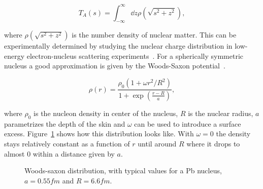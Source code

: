 \begin{equation}
T_A\left(s\right)=\int_{-\infty}^{\infty}\dd z \rho\left(\sqrt{s^2+z^2}\right),
\end{equation}

\noindent where $ \rho\left(\sqrt{s^2+z^2}\right)$ is the number density of nuclear matter. This can be experimentally determined by studying the nuclear charge distribution in low-energy electron-nucleus scattering experiments~\cite{Miller:2007ri,DeJager:1987qc}. For a spherically symmetric nucleus a good approximation is given by the Woods-Saxon potential~\cite{Abelev:2013qoq}. 

\begin{equation}
\rho\left( r\right) = \frac{\rho_0 \left(1+\omega r^2 / R^2\right)}{1+\exp \left(\frac{r-R}{a}\right)},
\end{equation}


\noindent where $\rho_0$ is the nucleon density in center of the nucleus, $R$ is the nuclear radius, $a$ parametrizes the depth of the skin and $\omega$ can be used to introduce a surface excess. Figure~\ref{fig:woodssaxon} shows how this distribution looks like. With $\omega=0$ the density stays relatively constant as a function of $r$ until around $R$ where it drops to almost 0 within a distance given by $a$. 

\begin{figure}
\centering
{}
\caption{Woods-saxon distribution, with typical values for a Pb nucleus, $a=0.55\unit{fm}$ and $R=6.6\unit{fm}$.}
\label{fig:woodssaxon}
\end{figure}


